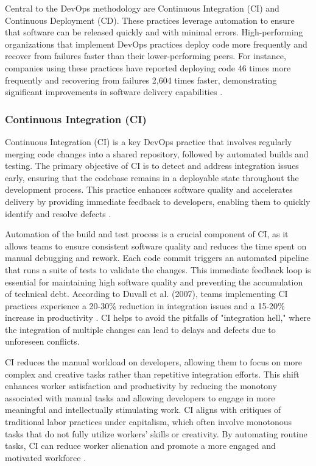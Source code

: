 \begin{refsection}
Central to the DevOps methodology are Continuous Integration (CI) and Continuous Deployment (CD). These practices leverage automation to ensure that software can be released quickly and with minimal errors. High-performing organizations that implement DevOps practices deploy code more frequently and recover from failures faster than their lower-performing peers. For instance, companies using these practices have reported deploying code 46 times more frequently and recovering from failures 2,604 times faster, demonstrating significant improvements in software delivery capabilities \cite[pp.~91-120]{humble2019continuous}.

\subsubsection{Continuous Integration (CI)}

Continuous Integration (CI) is a key DevOps practice that involves regularly merging code changes into a shared repository, followed by automated builds and testing. The primary objective of CI is to detect and address integration issues early, ensuring that the codebase remains in a deployable state throughout the development process. This practice enhances software quality and accelerates delivery by providing immediate feedback to developers, enabling them to quickly identify and resolve defects \cite[pp.~65-90]{duvall2007continuous}.

Automation of the build and test process is a crucial component of CI, as it allows teams to ensure consistent software quality and reduces the time spent on manual debugging and rework. Each code commit triggers an automated pipeline that runs a suite of tests to validate the changes. This immediate feedback loop is essential for maintaining high software quality and preventing the accumulation of technical debt. According to Duvall et al. (2007), teams implementing CI practices experience a 20-30\% reduction in integration issues and a 15-20\% increase in productivity \cite[pp.~65-90]{duvall2007continuous}. CI helps to avoid the pitfalls of "integration hell," where the integration of multiple changes can lead to delays and defects due to unforeseen conflicts.

CI reduces the manual workload on developers, allowing them to focus on more complex and creative tasks rather than repetitive integration efforts. This shift enhances worker satisfaction and productivity by reducing the monotony associated with manual tasks and allowing developers to engage in more meaningful and intellectually stimulating work. CI aligns with critiques of traditional labor practices under capitalism, which often involve monotonous tasks that do not fully utilize workers' skills or creativity. By automating routine tasks, CI can reduce worker alienation and promote a more engaged and motivated workforce \cite[pp.~90-120]{braverman1998labor}.


\end{refsection}
